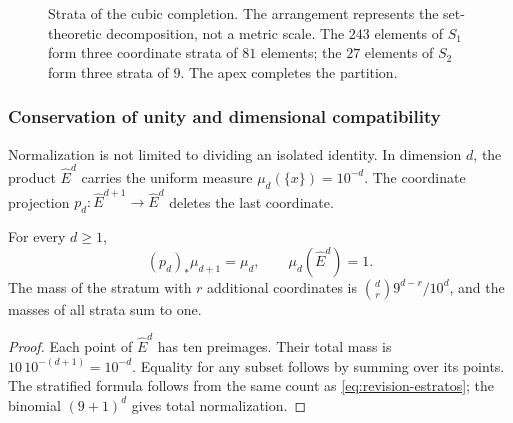 \begin{figure}[htbp]
\centering
{}
\caption{Strata of the cubic completion. The arrangement represents
the set-theoretic decomposition, not a metric scale. The \(243\) elements
of \(S_1\) form three coordinate strata of \(81\) elements; the \(27\)
elements of \(S_2\) form three strata of \(9\). The apex completes the partition.}
\label{fig:revision-emrh}
\end{figure}



\subsubsection{Conservation of unity and dimensional compatibility}

Normalization is not limited to dividing an isolated identity. In dimension
\(d\), the product \(\widehat E^d\) carries the uniform measure
\(\mu_d(\{x\})=10^{-d}\). The coordinate projection
\(p_d:\widehat E^{d+1}\to\widehat E^d\) deletes the last coordinate.

\begin{samepage}
\begin{proposition}
For every \(d\geq1\),
\[
 (p_d)_*\mu_{d+1}=\mu_d,
 \qquad \mu_d(\widehat E^d)=1.
\]
The mass of the stratum with \(r\) additional coordinates is
\(\binom dr9^{d-r}/10^d\), and the masses of all strata sum to one.
\end{proposition}
\end{samepage}
\begin{proof}
Each point of \(\widehat E^d\) has ten preimages. Their total mass is
\(10\,10^{-(d+1)}=10^{-d}\). Equality for any subset follows by
summing over its points. The stratified formula follows from the same
count as \eqref{eq:revision-estratos}; the binomial
\((9+1)^d\) gives total normalization.
\end{proof}

